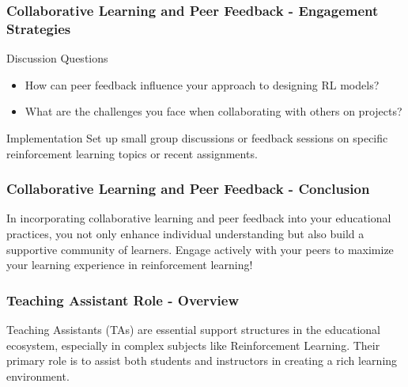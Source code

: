 \documentclass[aspectratio=169]{beamer}
\begin{document}
\begin{frame}[fragile]
    \frametitle{Collaborative Learning and Peer Feedback - Engagement Strategies}
    \begin{block}{Discussion Questions}
        \begin{itemize}
            \item How can peer feedback influence your approach to designing RL models?
            \item What are the challenges you face when collaborating with others on projects?
        \end{itemize}
    \end{block}

    \begin{block}{Implementation}
        Set up small group discussions or feedback sessions on specific reinforcement learning topics or recent assignments.
    \end{block}
\end{frame}

\begin{frame}[fragile]
    \frametitle{Collaborative Learning and Peer Feedback - Conclusion}
    In incorporating collaborative learning and peer feedback into your educational practices, you not only enhance individual understanding but also build a supportive community of learners. Engage actively with your peers to maximize your learning experience in reinforcement learning!
\end{frame}

\begin{frame}[fragile]
    \frametitle{Teaching Assistant Role - Overview}
    Teaching Assistants (TAs) are essential support structures in the educational ecosystem, especially in complex subjects like Reinforcement Learning. Their primary role is to assist both students and instructors in creating a rich learning environment.
\end{frame}
\end{document}
